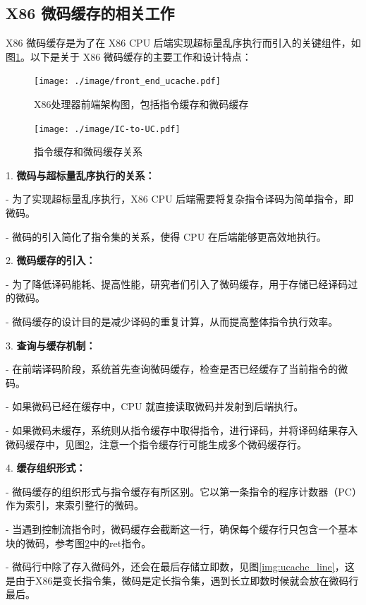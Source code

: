 \documentclass{Style/ucasproposal}%
\begin{document}
\subsection{X86 微码缓存的相关工作}

X86 微码缓存是为了在 X86 CPU 后端实现超标量乱序执行而引入的关键组件，如图\ref{img:front_end_ucache}。以下是关于 X86 微码缓存的主要工作和设计特点：

\begin{figure}[h]
  \centering
  \texttt{[image: ./image/front\_end\_ucache.pdf]}
  \caption{X86处理器前端架构图，包括指令缓存和微码缓存}
  \label{img:front_end_ucache}
\end{figure}

\begin{figure}[h]
  \centering
  \texttt{[image: ./image/IC-to-UC.pdf]}
  \caption{指令缓存和微码缓存关系}
  \label{img:IC_to_UC}
\end{figure}

1. \textbf{微码与超标量乱序执行的关系：}

   - 为了实现超标量乱序执行，X86 CPU 后端需要将复杂指令译码为简单指令，即微码。

   - 微码的引入简化了指令集的关系，使得 CPU 在后端能够更高效地执行。

2. \textbf{微码缓存的引入：}

- 为了降低译码能耗、提高性能，研究者们引入了微码缓存，用于存储已经译码过的微码。

- 微码缓存的设计目的是减少译码的重复计算，从而提高整体指令执行效率。

3. \textbf{查询与缓存机制：}
  
- 在前端译码阶段，系统首先查询微码缓存，检查是否已经缓存了当前指令的微码。

- 如果微码已经在缓存中，CPU 就直接读取微码并发射到后端执行。

- 如果微码未缓存，系统则从指令缓存中取得指令，进行译码，并将译码结果存入微码缓存中，见图\ref{img:IC_to_UC}，注意一个指令缓存行可能生成多个微码缓存行。

4. \textbf{缓存组织形式：}

- 微码缓存的组织形式与指令缓存有所区别。它以第一条指令的程序计数器（PC）作为索引，来索引整行的微码。

- 当遇到控制流指令时，微码缓存会截断这一行，确保每个缓存行只包含一个基本块的微码，参考图\ref{img:IC_to_UC}中的ret指令。

- 微码行中除了存入微码外，还会在最后存储立即数，见图\ref{img:ucache_line}，这是由于X86是变长指令集，微码是定长指令集，遇到长立即数时候就会放在微码行最后。
\end{document}

